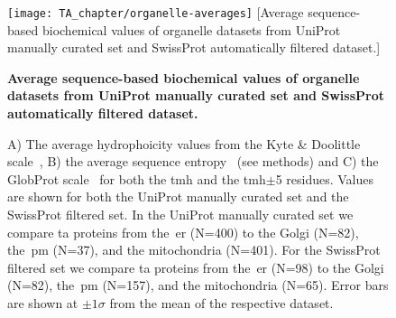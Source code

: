 \begin{figure}[!ht]
\centering
\texttt{[image: TA\_chapter/organelle-averages]}
[Average sequence-based biochemical values of organelle datasets from UniProt manually curated set and SwissProt automatically filtered dataset.]
{\textbf{Average sequence-based biochemical values of organelle datasets from UniProt manually curated set and SwissProt automatically filtered dataset.}

A) The average hydrophoicity values from the Kyte \& Doolittle scale~\cite{Kyte1982}, B) the average sequence entropy~\cite{Shannon1948} (see methods) and C) the GlobProt scale~\cite{Linding2003} for both the \gls{tmh} and the \gls{tmh}$\pm$5 residues.
Values are shown for both the UniProt manually curated set and the SwissProt filtered set.
In the UniProt manually curated set we compare \gls{ta} proteins from the~\gls{er} (N=400) to the Golgi (N=82), the~\gls{pm} (N=37), and the mitochondria (N=401).
For the SwissProt filtered set we compare \gls{ta} proteins from the~\gls{er} (N=98) to the Golgi (N=82), the~\gls{pm} (N=157), and the mitochondria (N=65).
Error bars are shown at $\pm 1 \sigma$ from the mean of the respective dataset.
}

\label{fig:average_organelle_factors_ta}
\end{figure}

